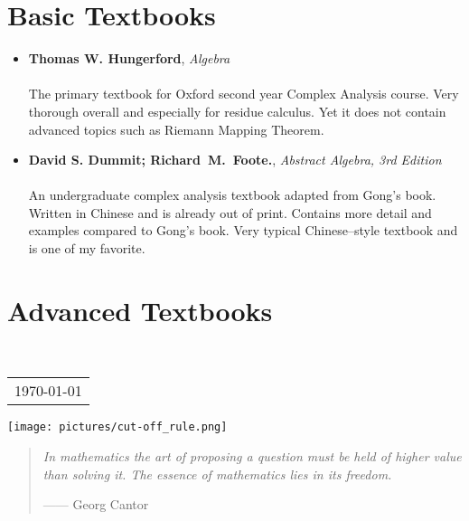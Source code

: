 \documentclass[12pt, a3paper, openany]{book}
\begin{document}
\section*{Basic Textbooks}
\begin{itemize}
	\item \textbf{Thomas W. Hungerford}, \textit{Algebra}\\
 \\
The primary textbook for Oxford second year Complex Analysis course. Very thorough overall and especially for residue
calculus. Yet it does not contain advanced topics such as Riemann Mapping Theorem.
	\item \textbf{David S. Dummit; Richard~M.~Foote.}, \textit{Abstract Algebra, 3rd Edition}\\
 \\
An undergraduate complex analysis textbook adapted from Gong’s book. Written in Chinese and is already out of print.
Contains more detail and examples compared to Gong’s book. Very typical Chinese–style textbook and is one of my favorite.
\end{itemize}

\section*{Advanced Textbooks}

~\\
\begin{flushright}
    \begin{tabular}{c}
        \\
        \today
    \end{tabular}
\end{flushright}

\begingroup
\renewcommand{\color}[1]{}
\listoffigures
\endgroup

\vspace{3ex}
\begin{center}
	\texttt{[image: pictures/cut-off\_rule.png]}
\end{center}
\vspace{1ex}
\begin{quotation}
	\textsl{In mathematics the art of proposing a question must be held of higher value than solving it. The essence of mathematics lies in its freedom.}
	
\hfill ------ Georg Cantor
\end{quotation}
\end{document}
